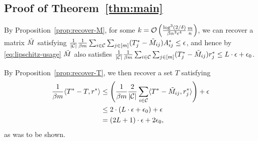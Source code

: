 \subsection{Proof of Theorem~\ref{thm:main}}
\label{thm:main-proof}

By Proposition~\ref{prop:recover-M}, for 
some $k = \mathcal{O}\left( \frac{\log^3(2/\delta)}{\beta\alpha^3\epsilon^4}{\frac{m}{n}} \right)$, 
we can recover a matrix $\tilde{M}$ satisfying 
$\frac{1}{|\mathcal{C}|}\frac{1}{\beta m}\sum_{i \in \mathcal{C}}\sum_{j \in [m]} (T^*_j - \tilde{M}_{ij})A^*_{ij} \leq \epsilon$, 
and hence by \eqref{eq:lipschitz-usage} $\tilde{M}$ also satisfies
$\frac{1}{|\mathcal{C}|}\frac{1}{\beta m}\sum_{i \in \mathcal{C}}\sum_{j \in [m]} (T^*_j - \tilde{M}_{ij})r^*_{j} \leq L \cdot \epsilon + \epsilon_0$.

By Proposition~\ref{prop:recover-T}, we then recover a set $T$ satisfying
\begin{align}
\frac{1}{\beta m}\langle T^* - T, r^* \rangle &\leq \left( \frac{1}{\beta m}\frac{2}{|\mathcal{C}|}\sum_{i \in \mathcal{C}}\langle T^* - \tilde{M}_{ij}, r^*_j \rangle \right) + \epsilon \\
 &\leq 2 \cdot \left( L \cdot \epsilon + \epsilon_0 \right) + \epsilon \\
 &= (2L+1)\cdot\epsilon+2\epsilon_0,
\end{align}
as was to be shown.
